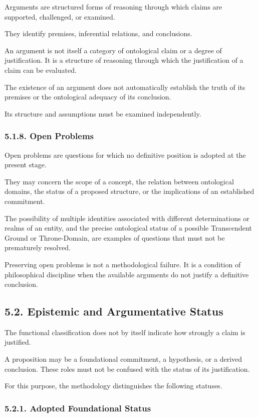 Arguments are structured forms of
reasoning through which claims are
supported, challenged, or examined.

They identify premises, inferential
relations, and conclusions.

An argument is not itself a category
of ontological claim or a degree
of justification. It is a structure
of reasoning through which the
justification of a claim can be
evaluated.

The existence of an argument does
not automatically establish the
truth of its premises or the
ontological adequacy of its conclusion.

Its structure and assumptions must
be examined independently.

\subsubsection*{5.1.8. Open Problems}

Open problems are questions for which
no definitive position is adopted
at the present stage.

They may concern the scope of a
concept, the relation between
ontological domains, the status
of a proposed structure, or the
implications of an established
commitment.

The possibility of multiple identities
associated with different determinations
or realms of an entity, and the precise
ontological status of a possible
Transcendent Ground or Throne-Domain,
are examples of questions that must
not be prematurely resolved.

Preserving open problems is not
a methodological failure. It is
a condition of philosophical discipline
when the available arguments do not
justify a definitive conclusion.

\subsection*{5.2. Epistemic and Argumentative Status}

The functional classification does
not by itself indicate how strongly
a claim is justified.

A proposition may be a foundational
commitment, a hypothesis, or a
derived conclusion. These roles
must not be confused with the
status of its justification.

For this purpose, the methodology
distinguishes the following statuses.

\subsubsection*{5.2.1. Adopted Foundational Status}

